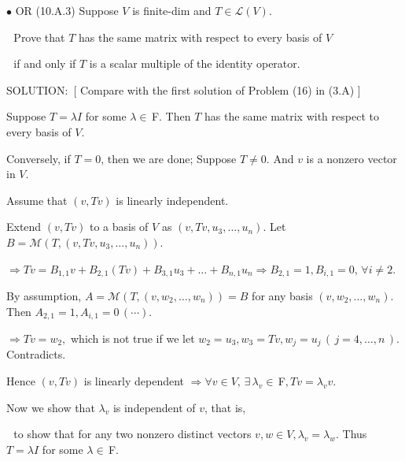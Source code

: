 \documentclass[a4paper, 11pt, UTF8]{article}
\def\Lm{\mathcal{L}}
\def\Mt{\mathcal{M}}
\def\Fbfc{$\,{\timesbf F}$}
\begin{document}
\begin{large}
{\small $\bullet$} O{\small R} (10.A.3) {\timessl\Large 
Suppose $V$ is finite-dim and $T\in\Lm(V)$.}\par\,\,
{\timessl\Large Prove that $T$ has the same matrix with respect to every basis of $V$}\par\,\,
{\timessl\Large if and only if $T$ is a scalar multiple of the identity operator.
}\par
{\timesbf S\footnotesize{OLUTION:}}\,\,\,[ Compare with the first solution of Problem (16) in (3.A) ]\par\quad
Suppose $T=\lambda I$ for some $\lambda\in\Fbfc.$ Then $T$ has the same matrix with respect to every basis of $V$.\par\quad
Conversely, if $T=0$, then we are done; Suppose $T\neq 0.$
And $v$ is a nonzero vector in $V$.\par\quad
 Assume that $(v,Tv)$ is linearly independent.\par\quad
Extend $(v,Tv)$ to a basis of $V$ as $(v,Tv,u_3,\dots,u_n).$ Let $B=\Mt(T,(v,Tv,u_3,\dots,u_n)).$\par\quad
$\Rightarrow Tv=B_{1,1} v+B_{2,1}(Tv)+B_{3,1}u_3+\dots+B_{n,1}u_n\Rightarrow B_{2,1}=1,B_{i,1}=0,\,\forall i\neq 2.$\par\quad
By assumption, $A=\Mt(T,(v,w_2,\dots,w_{n}))=B$ for any basis $(v,w_2,\dots,w_{n})$. Then $A_{2,1}=1,A_{i,1}=0\,(\cdots).$\par\quad
$\Rightarrow Tv=w_2,$ which is not true if we let $w_2=u_3,w_3=Tv,w_j=u_j\,(\,j=4,\dots,n\,).$ Contradicts.\par\quad
Hence $(v,Tv)$ is linearly dependent $\Rightarrow \forall v\in V,\,\exists\,\lambda_v\in\Fbfc,Tv=\lambda_v v.$\par\quad
Now we show that $\lambda_v$ is independent of $v$, that is, \par\qquad\quad\,\,
to show that for any two nonzero distinct vectors $v,w\in V,\lambda_v=\lambda_w$. Thus $T=\lambda I$ for some $\lambda\in\Fbfc.$\par\qquad{}
\end{large}
\end{document}
